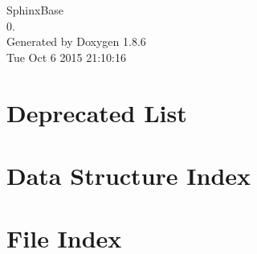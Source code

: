 \documentclass[twoside]{book}
\newcommand{\clearemptydoublepage}{%
  \newpage{\pagestyle{empty}\cleardoublepage}%
}
\begin{document}
\begin{titlepage}
\vspace*{7cm}
\begin{center}%
{\Large Sphinx\-Base \\[1ex]\large 0. }\\
\vspace*{1cm}
{\large Generated by Doxygen 1.8.6}\\
\vspace*{0.5cm}
{\small Tue Oct 6 2015 21:10:16}\\
\end{center}
\end{titlepage}
\clearemptydoublepage
\tableofcontents
\clearemptydoublepage
{}

\chapter{Deprecated List}
\label{deprecated}

\chapter{Data Structure Index}

\chapter{File Index}

\end{document}
